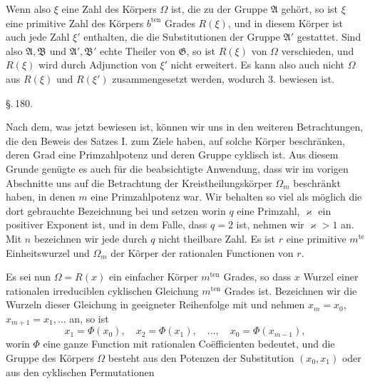 
Wenn also $\xi$ eine Zahl des Körpers $\Omega$ ist, die zu der
Gruppe $\mathfrak{A}$ gehört, so ist $\xi$ eine primitive Zahl des Körpers $b^{\mathrm{ten}}$
Grades $R(\xi)$, und in diesem Körper ist auch jede Zahl $\xi'$ enthalten,
die die Substitutionen der Gruppe $\mathfrak{A}'$ gestattet. Sind
also $\mathfrak{A}, \mathfrak{B}$ und $\mathfrak{A}', \mathfrak{B}'$ echte Theiler von $\mathfrak{G}$, so ist $R(\xi)$ von $\Omega$
verschieden, und $R(\xi)$ wird durch Adjunction von $\xi'$ nicht erweitert.
Es kann also auch nicht $\Omega$ aus $R(\xi)$ und $R(\xi')$ zusammengesetzt
werden, wodurch 3. bewiesen ist.

\begin{center}
\S.\,180.

\end{center}

Nach dem, was jetzt bewiesen ist, können wir uns in den
weiteren Betrachtungen, die den Beweis des Satzes I. zum Ziele
haben, auf solche  Körper beschränken, deren Grad
eine Primzahlpotenz und deren Gruppe cyklisch ist. Aus diesem
Grunde genügte es auch für die beabsichtigte Anwendung, dass
wir im vorigen Abschnitte uns auf die Betrachtung der Kreistheilungskörper
 $\Omega_m$ beschränkt haben, in denen $m$ eine Primzahlpotenz
 war. Wir behalten so viel als möglich die dort
gebrauchte Bezeichnung bei und setzen
worin $q$ eine Primzahl, $\varkappa$ ein positiver Exponent ist, und in dem
Falle, dass $q = 2$ ist, nehmen wir $\varkappa > 1$ an. Mit $n$ bezeichnen
wir jede durch $q$ nicht theilbare Zahl. Es ist $r$ eine primitive
$m^{\mathrm{te}}$ Einheitswurzel und $\Omega_m$ der Körper der rationalen Functionen
 von $r$.

Es sei nun $\Omega = R(x)$ ein einfacher  Körper $m^{\mathrm{ten}}$
Grades, so dass $x$ Wurzel einer rationalen irreduciblen cyklischen
Gleichung $m^{\mathrm{ten}}$ Grades ist. Bezeichnen wir die Wurzeln dieser
Gleichung in geeigneter Reihenfolge mit
und nehmen $x_m = x_0$, $x_{m+1} = x_1, \ldots$ an, so ist
\[
x_1 = \Phi(x_0), \quad x_2 = \Phi(x_1), \quad \ldots, \quad x_0 = \Phi(x_{m-1}),
\]
worin $\Phi$ eine ganze Function mit rationalen Coëfficienten bedeutet,
und die Gruppe des Körpers $\Omega$ besteht aus den Potenzen
der Substitution $(x_0, x_1)$ oder aus den cyklischen Permutationen
